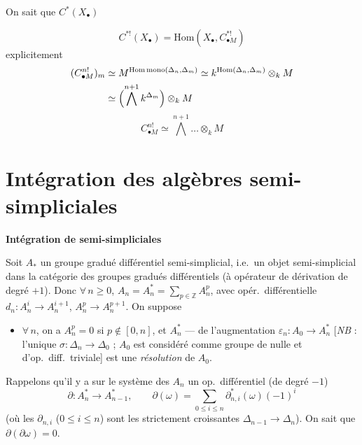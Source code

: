 \documentclass[11pt,a4paper]{article}
\begin{document}
On sait que \ill{} $C^{*}(X_\bullet)$ \ill{}


\ill{}
\[
  C^{*!}(X_\bullet) = \mathrm{Hom}(X_\bullet, C^{*!}_{\bullet M})
\]
\ill{} explicitement
\begin{align*}
  (C^{n!}_{\bullet M})_m &\simeq M^{\mathrm{Hom\,mono}(\Delta_n, \Delta_m)} \simeq k^{\mathrm{Hom}(\Delta_n, \Delta_m)} \otimes_k M \\
  &\simeq \Bigl(\bigwedge^{n+1} k^{\Delta_m}\Bigr) \otimes_k M
\end{align*}
\ill{}
\[
  C^{n!}_{\bullet M} \simeq \bigwedge^{n+1} \ldots \otimes_k M
\]

\section{Intégration des algèbres semi-simpliciales}

\textbf{Intégration de  semi-simpliciales}

Soit $A_{*}$ un groupe gradué différentiel semi-simplicial, i.e.\ un objet semi-simplicial dans
la catégorie des groupes gradués différentiels (à opérateur de dérivation de degré $+1$).
\struck{\ill{}} Donc $\forall\, n \geq 0$, $A_n = A_n^{*} = \sum_{p \in \mathbb{Z}} A_n^{p}$, avec
opér.\ différentielle $d_n : A_n^{i} \to A_n^{i+1}$, $A_n^{p} \to A_n^{p+1}$. On suppose
\begin{itemize}
  \item[(1)] $\forall\, n$, on a $A_n^{p} = 0$ si $p \notin [0, n]$, et  $A_n^{*}$ ---
   de l'augmentation $\varepsilon_n : A_0 \to A_n^{*}$
  [\emph{NB}  : l'unique $\sigma : \Delta_n \to \Delta_0$ ; $A_0$ est considéré
  comme groupe  de  nulle et d'op.\ diff.\ triviale] est une
  \emph{résolution} de $A_0$.
\end{itemize}

Rappelons qu'il y a sur le système des $A_n$ un op.\ différentiel (de degré $-1$)
\[
  \partial : A_n^{*} \to A_{n-1}^{*}, \qquad
  \partial(\omega) = \sum_{0 \leq i \leq n} \partial_{n,i}^{*}(\omega)(-1)^{i}
\]
(où les $\partial_{n,i}$ ($0 \leq i \leq n$) sont les   strictement
croissantes $\Delta_{n-1} \to \Delta_n$). On sait que $\partial(\partial\omega) = 0$.
\end{document}
